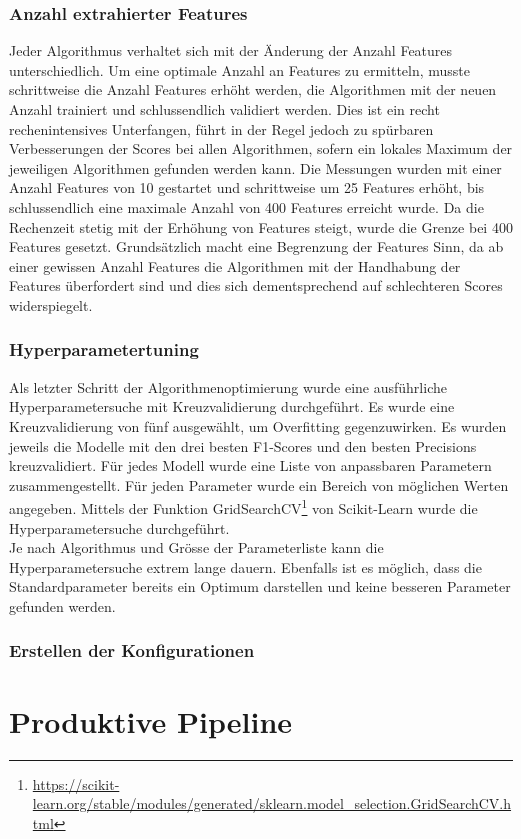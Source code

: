 \subsubsection{Anzahl extrahierter Features}
Jeder Algorithmus verhaltet sich mit der Änderung der Anzahl Features unterschiedlich.
Um eine optimale Anzahl an Features zu ermitteln, musste schrittweise die Anzahl Features erhöht werden, die Algorithmen mit der neuen Anzahl trainiert und schlussendlich validiert werden.
Dies ist ein recht rechenintensives Unterfangen, führt in der Regel jedoch zu spürbaren Verbesserungen der Scores bei allen Algorithmen, sofern ein lokales Maximum der jeweiligen Algorithmen gefunden werden kann.
Die Messungen wurden mit einer Anzahl Features von 10 gestartet und schrittweise um 25 Features erhöht, bis schlussendlich eine maximale Anzahl von 400 Features erreicht wurde.
Da die Rechenzeit stetig mit der Erhöhung von Features steigt, wurde die Grenze bei 400 Features gesetzt.
Grundsätzlich macht eine Begrenzung der Features Sinn, da ab einer gewissen Anzahl Features die Algorithmen mit der Handhabung der Features überfordert sind und dies sich dementsprechend auf schlechteren Scores widerspiegelt.
\subsubsection{Hyperparametertuning}
Als letzter Schritt der Algorithmenoptimierung wurde eine ausführliche Hyperparametersuche mit Kreuzvalidierung durchgeführt.
Es wurde eine Kreuzvalidierung von fünf ausgewählt, um Overfitting gegenzuwirken.
Es wurden jeweils die Modelle mit den drei besten F1-Scores und den besten Precisions kreuzvalidiert.
Für jedes Modell wurde eine Liste von anpassbaren Parametern zusammengestellt.
Für jeden Parameter wurde ein Bereich von möglichen Werten angegeben.
Mittels der Funktion \glqq GridSearchCV\grqq{}\footnote{\url{https://scikit-learn.org/stable/modules/generated/sklearn.model_selection.GridSearchCV.html}} von Scikit-Learn wurde die Hyperparametersuche durchgeführt.\\
Je nach Algorithmus und Grösse der Parameterliste kann die Hyperparametersuche extrem lange dauern.
Ebenfalls ist es möglich, dass die Standardparameter bereits ein Optimum darstellen und keine besseren Parameter gefunden werden.
\subsubsection{Erstellen der Konfigurationen}
\section{Produktive Pipeline}
